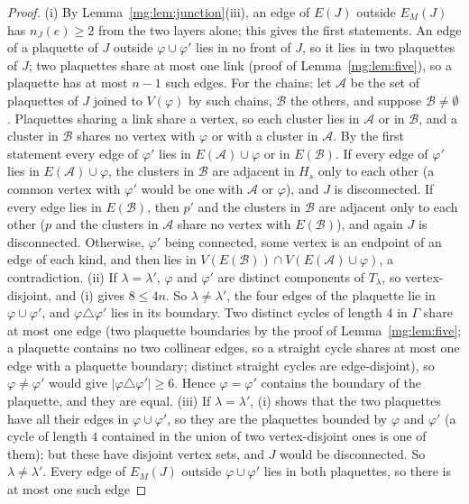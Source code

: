 \documentclass[11pt,a4paper]{article}
\theoremstyle{definition}
\theoremstyle{remark}
\begin{document}
\begin{proof}
(i) By Lemma~\ref{mg:lem:junction}(iii), an edge of $E(J)$ outside $E_M(J)$ has $n_J(e)\ge2$ from the two layers alone; this gives the first statements.
An edge of a plaquette of $J$ outside $\varphi\cup\varphi'$ lies in no front of $J$, so it lies in two plaquettes of $J$; two plaquettes share at most one link
(proof of Lemma~\ref{mg:lem:five}), so a plaquette has at most $n-1$ such edges. For the chains: let $\mathcal A$ be the set of plaquettes of $J$ joined to
$V(\varphi)$ by such chains, $\mathcal B$ the others, and suppose $\mathcal B\ne\emptyset$. Plaquettes sharing a link share a vertex, so each cluster lies in
$\mathcal A$ or in $\mathcal B$, and a cluster in $\mathcal B$ shares no vertex with $\varphi$ or with a cluster in $\mathcal A$. By the first statement every
edge of $\varphi'$ lies in $E(\mathcal A)\cup\varphi$ or in $E(\mathcal B)$. If every edge of $\varphi'$ lies in $E(\mathcal A)\cup\varphi$, the clusters in $\mathcal B$
are adjacent in $H_s$ only to each other (a common vertex with $\varphi'$ would be one with $\mathcal A$ or $\varphi$), and $J$ is disconnected. If every edge
lies in $E(\mathcal B)$, then $p'$ and the clusters in $\mathcal B$ are adjacent only to each other ($p$ and the clusters in $\mathcal A$ share no vertex with
$E(\mathcal B)$), and again $J$ is disconnected. Otherwise, $\varphi'$ being connected, some vertex is an endpoint of an edge of each kind, and then lies in
$V(E(\mathcal B))\cap V(E(\mathcal A)\cup\varphi)$, a contradiction.
(ii) If $\lambda=\lambda'$, $\varphi$ and $\varphi'$ are distinct components of $T_\lambda$, so vertex-disjoint, and (i) gives $8\le4n$. So $\lambda\neq\lambda'$, the
four edges of the plaquette lie in $\varphi\cup\varphi'$, and $\varphi\triangle\varphi'$ lies in its boundary. Two distinct cycles of length $4$ in $\Gamma$ share at most
one edge (two plaquette boundaries by the proof of Lemma~\ref{mg:lem:five}; a plaquette contains no two collinear edges, so a straight cycle shares
at most one edge with a plaquette boundary; distinct straight cycles are edge-disjoint), so $\varphi\ne\varphi'$ would give $|\varphi\triangle\varphi'|\ge6$. Hence
$\varphi=\varphi'$ contains the boundary of the plaquette, and they are equal.
(iii) If $\lambda=\lambda'$, (i) shows that the two plaquettes have all their edges in $\varphi\cup\varphi'$, so they are the plaquettes bounded by $\varphi$ and
$\varphi'$ (a cycle of length $4$ contained in the union of two vertex-disjoint ones is one of them); but these have disjoint vertex sets, and $J$
would be disconnected. So $\lambda\ne\lambda'$. Every edge of $E_M(J)$ outside $\varphi\cup\varphi'$ lies in both plaquettes, so there is at most one such edge

\end{proof}
\end{document}
